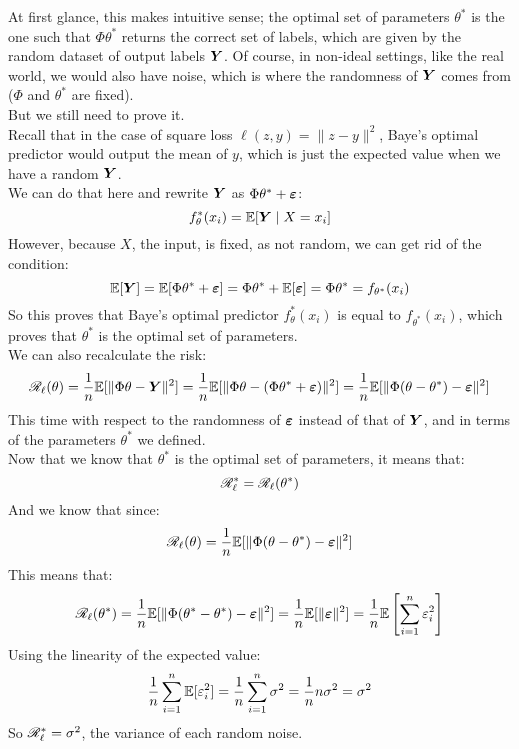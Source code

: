 \documentclass[12pt]{article}
\begin{document}
At first glance, this makes intuitive sense;
the optimal set of parameters $\theta^*$
is the one such that $\Phi \theta^*$
returns the correct set of labels,
which are given by the random dataset
of output labels $\boldsymbol{Y}$.
Of course, in non-ideal settings,
like the real world, we would also have noise,
which is where the randomness of $\boldsymbol{Y}$
comes from ($\Phi$ and $\theta^*$ are fixed). \\
But we still need to prove it. \\

Recall that in the case of square loss
$\ell(z, y) = \|z - y\|^2$,
Baye's optimal predictor would output
the mean of $y$, which is just the expected
value when we have a random $\boldsymbol{Y}$. \\
We can do that here and rewrite $\boldsymbol{Y}$
as $\Phi \theta^* + \boldsymbol{\varepsilon}$:
\[ f_{\theta}^*(x_i)
= \mathbb{E}[\boldsymbol{Y} \mid X = x_i] \]
However, because $X$, the input, is fixed,
as not random, we can get rid of the condition:
\[ \mathbb{E}[\boldsymbol{Y}] = \mathbb{E}[\Phi \theta^* + \boldsymbol{\varepsilon}]
= \Phi \theta^* + \mathbb{E}[\boldsymbol{\varepsilon}] = \Phi \theta^* 
= f_{\theta^*}(x_i) \]
So this proves that Baye's 
optimal predictor $f_{\theta}^*(x_i)$
is equal to $f_{\theta^*}(x_i)$,
which proves that $\theta^*$
is the optimal set of parameters. \\

We can also recalculate the risk:
\[ \mathscr{R}_{\ell}{}(\theta) = 
\dfrac{1}{n}\mathbb{E}[\|\Phi \theta - \boldsymbol{Y}\|^2]
= \dfrac{1}{n}\mathbb{E}[\|\Phi \theta 
- (\Phi \theta^* + \boldsymbol{\varepsilon}) \|^2]
= \dfrac{1}{n}\mathbb{E}[\|\Phi (\theta - \theta^*) 
- \boldsymbol{\varepsilon} \|^2] \]
This time with respect to the randomness of 
$\boldsymbol{\varepsilon}$ instead of that of $\boldsymbol{Y}$,
and in terms of the parameters $\theta^*$
we defined. \\

Now that we know that $\theta^*$ is the
optimal set of parameters, it means that:
\[ \mathscr{R}_{\ell}^* = \mathscr{R}_{\ell}(\theta^*) \]
And we know that since:
\[ \mathscr{R}_{\ell}{}(\theta) =
\dfrac{1}{n}\mathbb{E}[\|\Phi (\theta - \theta^*) 
- \boldsymbol{\varepsilon} \|^2] \]
This means that:
\[ \mathscr{R}_{\ell}{}(\theta^*) =
\dfrac{1}{n}\mathbb{E}[\|\Phi (\theta^* - \theta^*) 
- \boldsymbol{\varepsilon} \|^2] = \dfrac{1}{n}\mathbb{E}[\|\boldsymbol{\varepsilon}\|^2]
= \dfrac{1}{n}\mathbb{E}\left[ \sum_{i=1}^{n}\varepsilon_i^2 \right] \]
Using the linearity of the expected value:
\[ \dfrac{1}{n}\sum_{i=1}^{n} \mathbb{E}[\varepsilon_i^2]
= \dfrac{1}{n}\sum_{i=1}^{n} \sigma^2
= \dfrac{1}{n} n\sigma^2 = \sigma^2 \]
So $\mathscr{R}_{\ell}^* = \sigma^2$,
the variance of each random noise. \\
\end{document}
